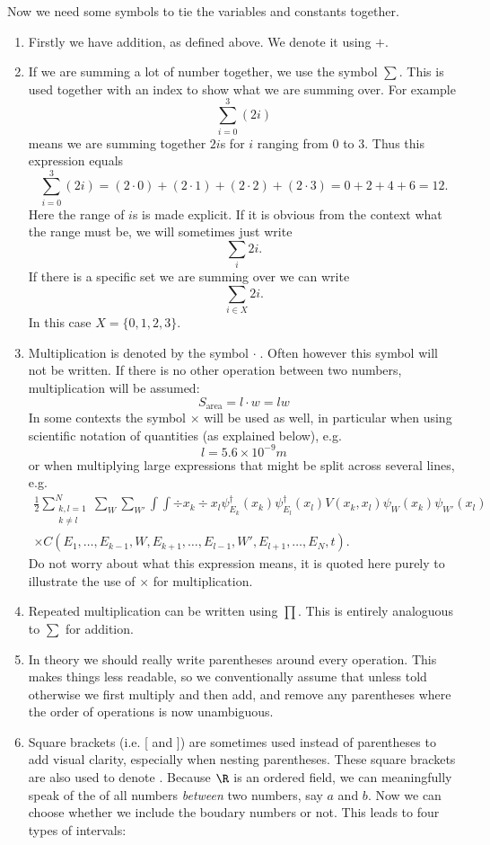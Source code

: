 Now we need some symbols to tie the variables and constants together.

\begin{enumerate}
\item Firstly we have addition, as defined above. We denote it using $+$.
\item If we are summing a lot of number together, we use the symbol $\sum$. This is used together with an index to show what we are summing over. For example
\[ \sum_{i=0}^3 (2i) \]
means we are summing together $2i$s for $i$ ranging from $0$ to $3$. Thus this expression equals
\[ \sum_{i=0}^3 (2i) = (2\cdot 0) + (2\cdot 1) + (2\cdot 2) + (2\cdot 3) = 0 + 2 + 4 + 6 = 12. \]
Here the range of $i$s is made explicit. If it is obvious from the context what the range must be, we will sometimes just write
\[ \sum_i 2i. \]
If there is a specific set we are summing over we can write
\[ \sum_{i\in X} 2i.  \]
In this case $X = \{0,1,2,3\}$.
\item Multiplication is denoted by the symbol $\cdot\;$. Often however this symbol will not be written. If there is no other operation between two numbers, multiplication will be assumed:
\[ S_\text{area} = l\cdot w = lw \]
In some contexts the symbol $\times$ will be used as well, in particular when using scientific notation of quantities (as explained below), e.g.
\[ l = 5.6 \times 10^{-9} \si{m} \]
or when multiplying large expressions that might be split across several lines, e.g.
\begin{multline*}
\frac{1}{2}\sum^N_{\substack{k,l=1 \\ k \neq l}} \sum_W \sum_{W'} \int\int \div{x_k}\div{x_l} \psi_{E_k}^\dagger(x_k)\psi_{E_l}^\dagger(x_l) V(x_k,x_l)\psi_W(x_k)\psi_{W'}(x_l) \\ \times C(E_1, \ldots, E_{k-1}, W, E_{k+1}, \ldots, E_{l-1},W',E_{l+1}, \ldots, E_N,t).
\end{multline*}
Do not worry about what this expression means, it is quoted here purely to illustrate the use of $\times$ for multiplication.
\item Repeated multiplication can be written using $\prod$. This is entirely analoguous to $\sum$ for addition.
\item In theory we should really write parentheses around every operation. This makes things less readable, so we conventionally assume that unless told otherwise we first multiply and then add, and remove any parentheses where the order of operations is now unambiguous.
\item Square brackets (i.e. [ and ]) are sometimes used instead of parentheses to add visual clarity, especially when nesting parentheses. These square brackets are also used to denote . Because $\R$ is an ordered field, we can meaningfully speak of the  of all numbers \textit{between} two numbers, say $a$ and $b$. Now we can choose whether we include the boudary numbers or not. This leads to four types of intervals:

\end{enumerate}
